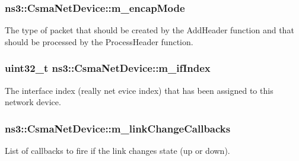 \subsubsection[{\texorpdfstring{m\+\_\+encap\+Mode}{m_encapMode}}]{ ns3\+::\+Csma\+Net\+Device\+::m\+\_\+encap\+Mode\hspace{0.3cm}{\ttfamily [private]}}\hypertarget{classns3_1_1CsmaNetDevice_a3f4b374840119abfa65dbe2075533f39}{}\label{classns3_1_1CsmaNetDevice_a3f4b374840119abfa65dbe2075533f39}
The type of packet that should be created by the Add\+Header function and that should be processed by the Process\+Header function. 
\subsubsection[{\texorpdfstring{m\+\_\+if\+Index}{m_ifIndex}}]{\setlength{\rightskip}{0pt plus 5cm}uint32\+\_\+t ns3\+::\+Csma\+Net\+Device\+::m\+\_\+if\+Index\hspace{0.3cm}{\ttfamily [private]}}\hypertarget{classns3_1_1CsmaNetDevice_af2bb0a9e64ae4ee179256f480e4eed4e}{}\label{classns3_1_1CsmaNetDevice_af2bb0a9e64ae4ee179256f480e4eed4e}
The interface index (really net evice index) that has been assigned to this network device. 
\subsubsection[{\texorpdfstring{m\+\_\+link\+Change\+Callbacks}{m_linkChangeCallbacks}}]{ ns3\+::\+Csma\+Net\+Device\+::m\+\_\+link\+Change\+Callbacks\hspace{0.3cm}{\ttfamily [private]}}\hypertarget{classns3_1_1CsmaNetDevice_a67dd7e65384a1b9f89dfacc1ede41d69}{}\label{classns3_1_1CsmaNetDevice_a67dd7e65384a1b9f89dfacc1ede41d69}
List of callbacks to fire if the link changes state (up or down). 
